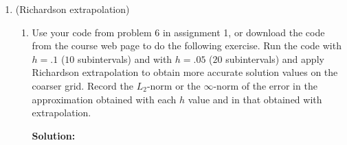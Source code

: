 \documentclass[letterpaper,12pt]{article}
\begin{document}
\begin{enumerate}
\begin{enumerate}
{\bf Solution:}

The global error is related to the local error by 
\[A e = \tau\]
Where A is 
\[ \frac{1}{h^2} \left( \begin{array}{cccccc}
2 + (1 + x_0^2 )h^2 & -1 &        &        &    &  \\
-1  & 2 + (1 + x_i^2 )h^2 & -1      &        &    &  \\
   & -1  & \ddots & \ddots &     & \\
   &    & \ddots & \ddots & \ddots   & \\
   &    &        & -1      & 2 + (1 + x_i^2 )h^2 & -1 \\
      &    &        &       & -1 & 2 + (1 + x_n^2 )h^2 \\
   \end{array} \right)
\]
By Gerschgorin's theorem,
\[|\lambda -(2 + (1 + x_i^2 )h^2)| \leq 2\]
\[- 2\leq \lambda -(2 + (1 + x_i^2 )h^2) \leq 2\]
\[ (1 + x_i^2 )h^2\leq \lambda  \leq 4 + (1 + x_i^2 )h^2\]
\[ h^2\leq \lambda  \leq 4 + 2h^2\]
\[ 1\leq \frac{\lambda}{h^2}  \leq \frac{4}{h^2} + 2\]

Thus, the eigenvalues of the coefficient matrix lie in 1 and $\frac{4}{h^2} + 2$
\item
Show that the $L_2$-norm of the {\em global error} is of the same order as the local
truncation error.

{\bf Solution:}


\[e = A^{-1}\tau\]
\[||e||_2 = ||A^{-1}\tau||_2 \leq ||A^{-1}||_2||\tau||_2 \leq \lambda(A^{-1})_{max}||\tau||_2 \]
Since
\[ 1\leq \lambda(A)  \leq \frac{4}{h^2} + 2\]
\[ \frac{h^2}{4 + 2h^2} \leq \lambda(A^{-1}) \leq 1 \]
Thus,
\[||e||_2 \leq ||\tau||_2\]

\end{enumerate}

\newpage
\item (Richardson extrapolation)
\begin{enumerate}
 \item 

Use your code from problem 6 in assignment 1, or download the code from the
course web page to do the following exercise.  Run the code with $h = .1$
($10$ subintervals) and with $h=.05$ ($20$ subintervals) and apply
Richardson extrapolation to obtain more accurate solution values on the
coarser grid.  Record the $L_2$-norm or the $\infty$-norm of the error
in the approximation obtained with each $h$ value and in that obtained
with extrapolation.

{\bf Solution:}


\end{enumerate}
\end{enumerate}
\end{document}

